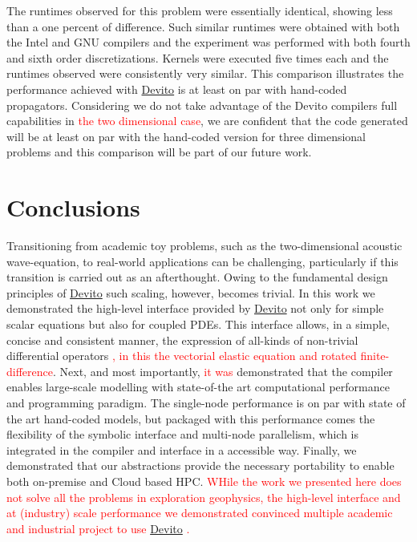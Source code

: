 \documentclass[10pt, conference]{IEEEtran}
\newcommand{\devito}{\href{https://github.com/devitocodes/devito}{Devito} }
\begin{document}
The runtimes observed for this problem were essentially identical,
showing less than a one percent of difference. Such similar runtimes were
obtained with both the Intel and GNU compilers and the
experiment was performed with both fourth and sixth order discretizations.
Kernels were executed five times each and the
runtimes observed were consistently very similar. This comparison
illustrates the performance achieved with \devito is at least on par with
hand-coded propagators. Considering we do not take advantage of the Devito
compilers full capabilities in \textcolor{red}{the two dimensional case}, we are confident
that the code generated will be at least on par with the hand-coded version
for three dimensional problems and this comparison will be part of our future
work.

\section{Conclusions}\label{conclusions}

Transitioning from academic toy problems, such as the two-dimensional
acoustic wave-equation, to real-world applications can be challenging,
particularly if this transition is carried out as an afterthought.
Owing to the fundamental design principles of \devito such scaling,
however, becomes trivial. In this work we demonstrated
the high-level interface provided by \devito not only for simple scalar
equations but also for coupled PDEs. This interface allows, in a simple, concise
and consistent manner, the expression of all-kinds of non-trivial differential operators \textcolor{red}{, in this the vectorial elastic equation 
and rotated finite-difference}. Next, and most
importantly, \textcolor{red}{it was} demonstrated that the compiler enables large-scale modelling with
state-of-the art computational performance and programming paradigm. The
single-node performance is on par with state of the art hand-coded models, but
packaged with this performance comes
the flexibility of the symbolic interface and multi-node parallelism, which is
integrated in the compiler and interface in a accessible way. Finally,
we demonstrated that our abstractions provide the necessary portability
to enable both on-premise and Cloud based HPC. \textcolor{red}{WHile the work we 
presented here does not solve all the problems in exploration geophysics, the high-level interface 
and at (industry) scale performance we demonstrated convinced
multiple academic and industrial project to use \devito.}
\end{document}
